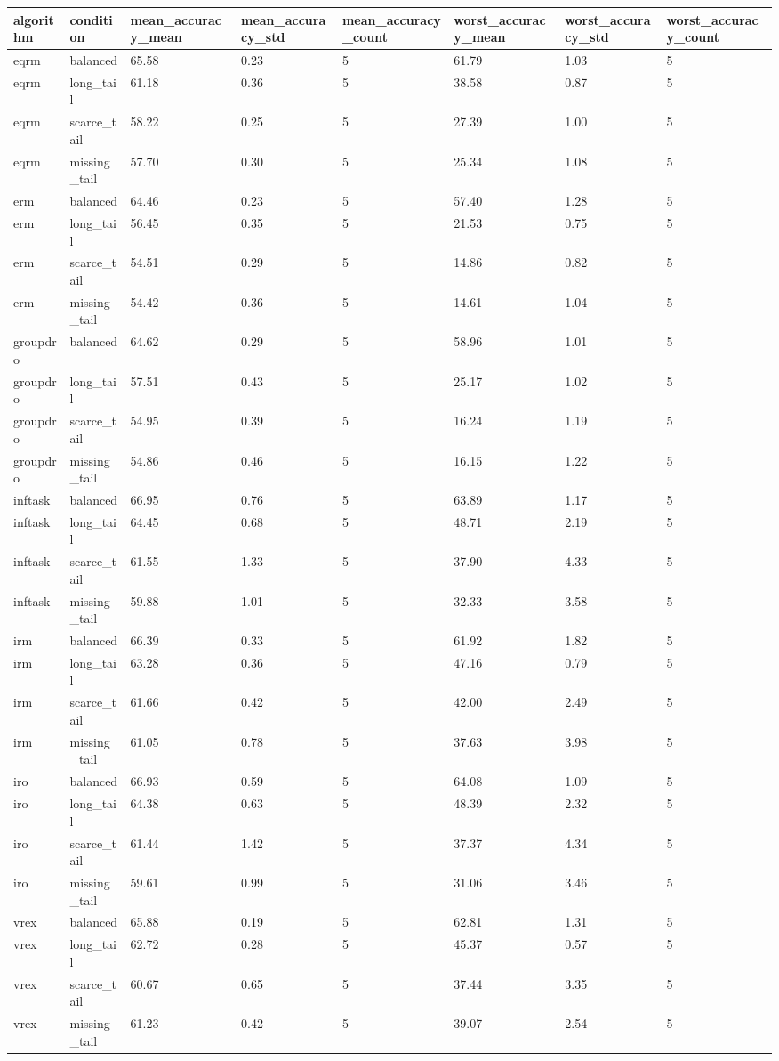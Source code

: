 \begin{tabular}{llllllll}
\toprule
algorithm & condition & mean\_accuracy\_mean & mean\_accuracy\_std & mean\_accuracy\_count & worst\_accuracy\_mean & worst\_accuracy\_std & worst\_accuracy\_count \\
\midrule
eqrm & balanced & 65.58 & 0.23 & 5 & 61.79 & 1.03 & 5 \\
eqrm & long\_tail & 61.18 & 0.36 & 5 & 38.58 & 0.87 & 5 \\
eqrm & scarce\_tail & 58.22 & 0.25 & 5 & 27.39 & 1.00 & 5 \\
eqrm & missing\_tail & 57.70 & 0.30 & 5 & 25.34 & 1.08 & 5 \\
erm & balanced & 64.46 & 0.23 & 5 & 57.40 & 1.28 & 5 \\
erm & long\_tail & 56.45 & 0.35 & 5 & 21.53 & 0.75 & 5 \\
erm & scarce\_tail & 54.51 & 0.29 & 5 & 14.86 & 0.82 & 5 \\
erm & missing\_tail & 54.42 & 0.36 & 5 & 14.61 & 1.04 & 5 \\
groupdro & balanced & 64.62 & 0.29 & 5 & 58.96 & 1.01 & 5 \\
groupdro & long\_tail & 57.51 & 0.43 & 5 & 25.17 & 1.02 & 5 \\
groupdro & scarce\_tail & 54.95 & 0.39 & 5 & 16.24 & 1.19 & 5 \\
groupdro & missing\_tail & 54.86 & 0.46 & 5 & 16.15 & 1.22 & 5 \\
inftask & balanced & 66.95 & 0.76 & 5 & 63.89 & 1.17 & 5 \\
inftask & long\_tail & 64.45 & 0.68 & 5 & 48.71 & 2.19 & 5 \\
inftask & scarce\_tail & 61.55 & 1.33 & 5 & 37.90 & 4.33 & 5 \\
inftask & missing\_tail & 59.88 & 1.01 & 5 & 32.33 & 3.58 & 5 \\
irm & balanced & 66.39 & 0.33 & 5 & 61.92 & 1.82 & 5 \\
irm & long\_tail & 63.28 & 0.36 & 5 & 47.16 & 0.79 & 5 \\
irm & scarce\_tail & 61.66 & 0.42 & 5 & 42.00 & 2.49 & 5 \\
irm & missing\_tail & 61.05 & 0.78 & 5 & 37.63 & 3.98 & 5 \\
iro & balanced & 66.93 & 0.59 & 5 & 64.08 & 1.09 & 5 \\
iro & long\_tail & 64.38 & 0.63 & 5 & 48.39 & 2.32 & 5 \\
iro & scarce\_tail & 61.44 & 1.42 & 5 & 37.37 & 4.34 & 5 \\
iro & missing\_tail & 59.61 & 0.99 & 5 & 31.06 & 3.46 & 5 \\
vrex & balanced & 65.88 & 0.19 & 5 & 62.81 & 1.31 & 5 \\
vrex & long\_tail & 62.72 & 0.28 & 5 & 45.37 & 0.57 & 5 \\
vrex & scarce\_tail & 60.67 & 0.65 & 5 & 37.44 & 3.35 & 5 \\
vrex & missing\_tail & 61.23 & 0.42 & 5 & 39.07 & 2.54 & 5 \\
\bottomrule
\end{tabular}
